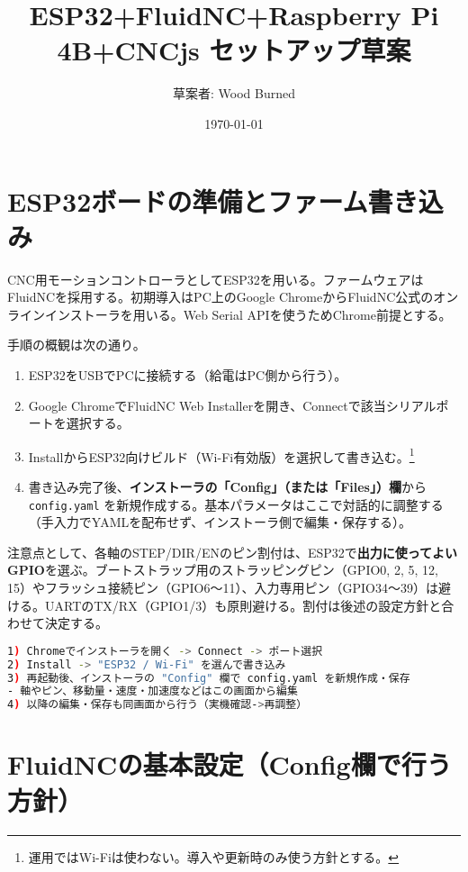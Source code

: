 \documentclass[uplatex,dvipdfmx]{ujarticle}
\begin{document}
\title{ESP32+FluidNC+Raspberry Pi 4B+CNCjs セットアップ草案}
\author{草案者: Wood Burned}
\date{\today}
\maketitle

\section{ESP32ボードの準備とファーム書き込み}

CNC用モーションコントローラとしてESP32を用いる。ファームウェアはFluidNCを採用する。初期導入はPC上のGoogle ChromeからFluidNC公式のオンラインインストーラを用いる。Web Serial APIを使うためChrome前提とする。

手順の概観は次の通り。
\begin{enumerate}
\item ESP32をUSBでPCに接続する（給電はPC側から行う）。
\item Google ChromeでFluidNC Web Installerを開き、Connectで該当シリアルポートを選択する。
\item InstallからESP32向けビルド（Wi-Fi有効版）を選択して書き込む。\footnote{運用ではWi-Fiは使わない。導入や更新時のみ使う方針とする。}
\item 書き込み完了後、\textbf{インストーラの「Config」（または「Files」）欄}から \texttt{config.yaml} を新規作成する。基本パラメータはここで対話的に調整する（手入力でYAMLを配布せず、インストーラ側で編集・保存する）。
\end{enumerate}

注意点として、各軸のSTEP/DIR/ENのピン割付は、ESP32で\textbf{出力に使ってよいGPIO}を選ぶ。ブートストラップ用のストラッピングピン（GPIO0, 2, 5, 12, 15）やフラッシュ接続ピン（GPIO6〜11）、入力専用ピン（GPIO34〜39）は避ける。UARTのTX/RX（GPIO1/3）も原則避ける。割付は後述の設定方針と合わせて決定する。

\begin{lstlisting}[caption=Chromeでの書き込みとconfig作成の流れ（要点）, label=code:installer, language=bash]
1) Chromeでインストーラを開く -> Connect -> ポート選択
2) Install -> "ESP32 / Wi-Fi" を選んで書き込み
3) 再起動後、インストーラの "Config" 欄で config.yaml を新規作成・保存
- 軸やピン、移動量・速度・加速度などはこの画面から編集
4) 以降の編集・保存も同画面から行う（実機確認->再調整）

\end{lstlisting}

\section{FluidNCの基本設定（Config欄で行う方針）}
\end{document}
